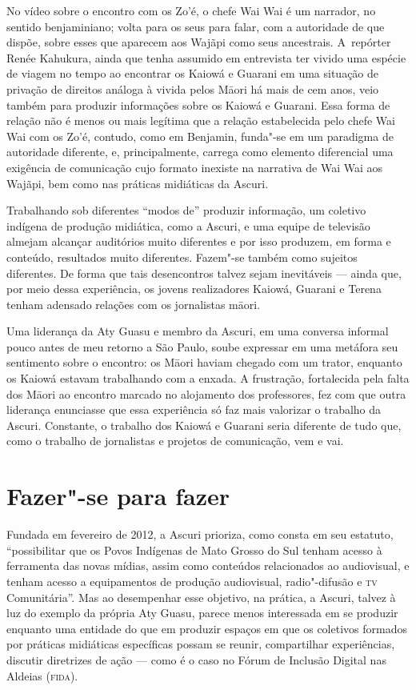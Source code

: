 No vídeo sobre o encontro com os Zo’é, o chefe Wai Wai é um narrador, no
sentido benjaminiano; volta para os seus para falar, com a autoridade de que dispõe, sobre esses que aparecem aos Wajãpi como seus
ancestrais. A~repórter Renée Kahukura, ainda que tenha assumido em
entrevista ter vivido uma espécie de viagem no tempo ao encontrar os
Kaiowá e Guarani em uma situação de privação de direitos análoga à
vivida pelos M\=aori há mais de cem anos, veio também para produzir
informações sobre os Kaiowá e Guarani. Essa forma de relação não é
menos ou mais legítima que a relação estabelecida pelo chefe Wai Wai
com os Zo’é, contudo, como em Benjamin, funda"-se em um paradigma de
autoridade diferente, e, principalmente, carrega como elemento
diferencial uma exigência de comunicação cujo formato inexiste na
narrativa de Wai Wai aos Wajãpi, bem como nas práticas midiáticas da
Ascuri.

Trabalhando sob diferentes ``modos de'' produzir informação, um coletivo
indígena de produção midiática, como a Ascuri, e uma equipe de
televisão almejam alcançar auditórios muito diferentes e por isso
produzem, em forma e conteúdo, resultados muito diferentes. Fazem"-se
também como sujeitos diferentes. De forma que tais desencontros talvez
sejam inevitáveis --- ainda que, por meio dessa experiência, os jovens
realizadores Kaiowá, Guarani e Terena tenham adensado relações com os
jornalistas m\=aori.

Uma liderança da Aty Guasu e membro da Ascuri, em uma conversa informal
pouco antes de meu retorno a São Paulo, soube expressar em uma metáfora
seu sentimento sobre o encontro: os M\=aori haviam chegado com um
trator, enquanto os Kaiowá estavam trabalhando com a enxada. A
frustração, fortalecida pela falta dos M\=aori ao encontro marcado no
alojamento dos professores, fez com que outra liderança enunciasse que
essa experiência só faz mais valorizar o trabalho da Ascuri. Constante,
o trabalho dos Kaiowá e Guarani seria diferente de tudo que, como o
trabalho de jornalistas e projetos de comunicação, vem e vai.

\section{Fazer"-se para fazer}

Fundada em fevereiro de 2012, a Ascuri prioriza, como consta em seu
estatuto, ``possibilitar que os Povos Indígenas de Mato
Grosso do Sul tenham acesso à ferramenta das novas mídias, assim como
conteúdos relacionados ao audiovisual, e tenham acesso a equipamentos
de produção audiovisual, radio"-difusão e \textsc{tv} Comunitária''.
Mas ao desempenhar esse objetivo, na prática, a Ascuri, talvez à luz do
exemplo da própria Aty Guasu, parece menos interessada em se produzir
enquanto uma entidade do que em produzir espaços em que os coletivos
formados por práticas midiáticas específicas possam se reunir,
compartilhar experiências, discutir diretrizes de ação --- como é o caso
no Fórum de Inclusão Digital nas Aldeias (\textsc{fida}).

